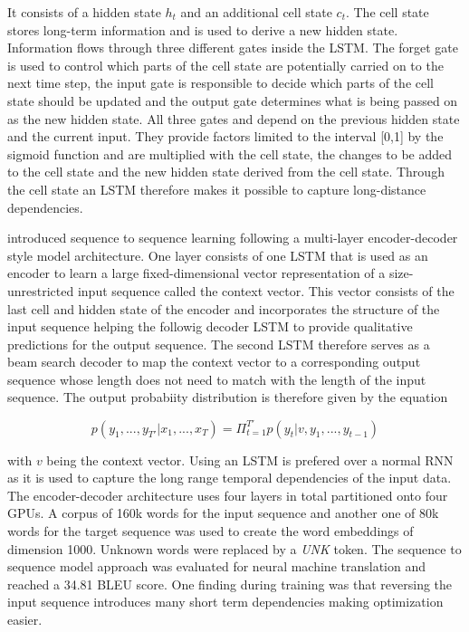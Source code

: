 It consists of a hidden state $h_t$ and an additional cell state $c_t$. The cell state stores long-term information and is used to derive a new hidden state. Information flows through three different gates inside the \ac{LSTM}. The forget gate is used to control which parts of the cell state are potentially carried on to the next time step, the input gate is responsible to decide which parts of the cell state should be updated and the output gate determines what is being passed on as the new hidden state. All three gates and depend on the previous hidden state and the current input. They provide factors limited to the interval [0,1] by the sigmoid function and are multiplied with the cell state, the changes to be added to the cell state and the new hidden state derived from the cell state. Through the cell state an \ac{LSTM} therefore makes it possible to capture long-distance dependencies. \cite{Gertz2020}

\cite{Sutskever2014} introduced sequence to sequence learning following a multi-layer encoder-decoder style model architecture. One layer consists of one \ac{LSTM} that is used as an encoder to learn a large fixed-dimensional vector representation of a size-unrestricted input sequence called the context vector. This vector consists of the last cell and hidden state of the encoder and incorporates the structure of the input sequence helping the followig decoder \ac{LSTM} to provide qualitative predictions for the output sequence. The second \ac{LSTM} therefore serves as a beam search decoder to map the context vector to a corresponding output sequence whose length does not need to match with the length of the input sequence. The output probabiity distribution is therefore given by the equation

\begin{equation}
	p(y_1, ..., y_{T'} | x_1, ..., x_{T}) = \Pi_{t=1}^{T'} p(y_t | v, y_1, ..., y_{t-1})
\end{equation}

with $v$ being the context vector. Using an \ac{LSTM} is prefered over a normal \ac{RNN} as it is used to capture the long range temporal dependencies of the input data. The encoder-decoder architecture uses four layers in total partitioned onto four \acp{GPU}. A corpus of 160k words for the input sequence and another one of 80k words for the target sequence was used to create the word embeddings of dimension 1000. Unknown words were replaced by a \textit{UNK} token. The sequence to sequence model approach was evaluated for neural machine translation and reached a 34.81 BLEU score. One finding during training was that reversing the input sequence introduces many short term dependencies making optimization easier. \cite{Sutskever2014}

